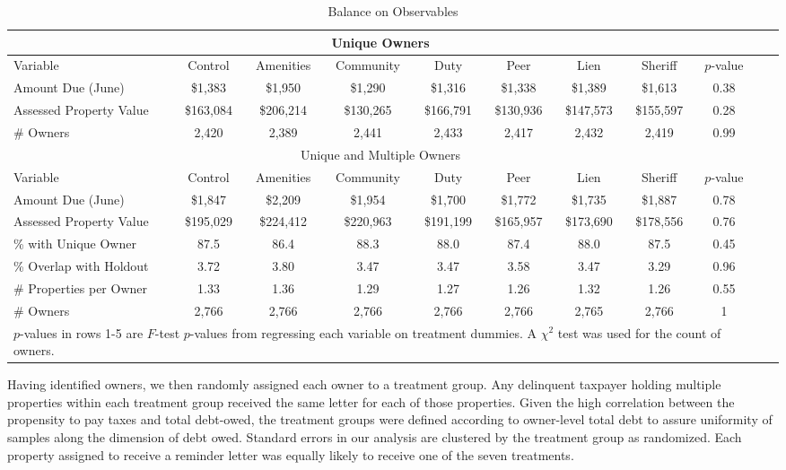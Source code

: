 \documentclass[12pt]{article}
\begin{document}
\begin{sidewaystable}[htbp]
\caption{Balance on Observables} \label{balance}
\bigskip
\centering
\begin{tabular}{l c c c c c c c c c c}
\hline
\multicolumn{9}{c}{Unique Owners} \\
\hline
Variable & Control & Amenities & Community & Duty & Peer & Lien & Sheriff & $p$-value \\ 
\hline
Amount Due (June) & \$1,383 & \$1,950 & \$1,290 & \$1,316 & \$1,338 & \$1,389 & \$1,613 & 0.38 \\ 
Assessed Property Value & \$163,084 & \$206,214 & \$130,265 & \$166,791 & \$130,936 & \$147,573 & \$155,597 & 0.28 \\ 
\# Owners & 2,420 & 2,389 & 2,441 & 2,433 & 2,417 & 2,432 & 2,419 & 0.99 \\ 
\hline 
\multicolumn{9}{c}{Unique and Multiple Owners} \\
\hline
Variable & Control & Amenities & Community & Duty & Peer & Lien & Sheriff & $p$-value \\ 
\hline
Amount Due (June) & \$1,847 & \$2,209 & \$1,954 & \$1,700 & \$1,772 & \$1,735 & \$1,887 & 0.78 \\ 
Assessed Property Value & \$195,029 & \$224,412 & \$220,963 & \$191,199 & \$165,957 & \$173,690 & \$178,556 & 0.76 \\ 
\% with Unique Owner & 87.5 & 86.4 & 88.3 & 88.0 & 87.4 & 88.0 & 87.5 & 0.45 \\ 
\% Overlap with Holdout & 3.72 & 3.80 & 3.47 & 3.47 & 3.58 & 3.47 & 3.29 & 0.96 \\ 
\# Properties per Owner & 1.33 & 1.36 & 1.29 & 1.27 & 1.26 & 1.32 & 1.26 & 0.55 \\ 
\# Owners & 2,766 & 2,766 & 2,766 & 2,766 & 2,766 & 2,765 & 2,766 & 1 \\ 
\hline 
\multicolumn{9}{l}{\scriptsize{$p$-values in rows 1-5 are $F$-test $p$-values from regressing each variable on treatment dummies. A $\chi^2$ test was used for the count of owners.}} \\ 
\end{tabular}
\end{sidewaystable}

Having identified owners, we then randomly assigned each owner to a
treatment group.  Any delinquent taxpayer holding multiple properties
within each treatment group received the same letter for each of those
properties.  Given the high correlation between the propensity to pay
taxes and total debt-owed, the treatment groups were defined according
to owner-level total debt to assure uniformity of samples along the
dimension of debt owed.  Standard errors in our analysis are clustered
by the treatment group as randomized.  Each property assigned to
receive a reminder letter was equally likely to receive one of the
seven treatments.
\end{document}
